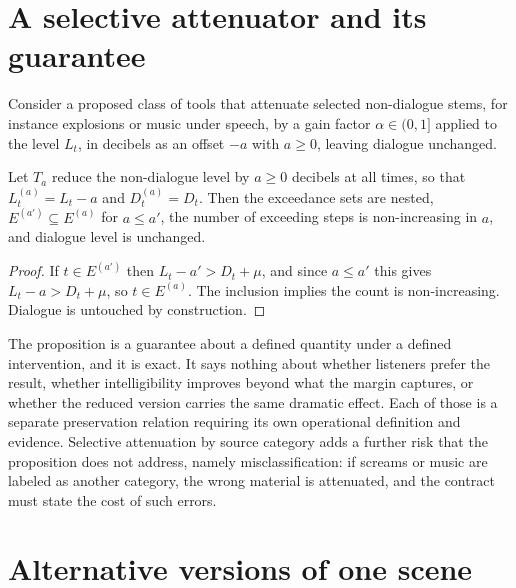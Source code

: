 \section{A selective attenuator and its guarantee}

Consider a proposed class of tools that attenuate selected non-dialogue stems, for instance explosions or music under speech, by a gain factor $\alpha\in(0,1]$ applied to the level $L_t$, in decibels as an offset $-a$ with $a\ge0$, leaving dialogue unchanged.

\begin{proposition}\label{prop:mufflerizer}
Let $T_a$ reduce the non-dialogue level by $a\ge0$ decibels at all times, so that $L_t^{(a)}=L_t-a$ and $D_t^{(a)}=D_t$. Then the exceedance sets are nested, $E^{(a')}\subseteq E^{(a)}$ for $a\le a'$, the number of exceeding steps is non-increasing in $a$, and dialogue level is unchanged.
\end{proposition}

\begin{proof}
If $t\in E^{(a')}$ then $L_t-a'>D_t+\mu$, and since $a\le a'$ this gives $L_t-a>D_t+\mu$, so $t\in E^{(a)}$. The inclusion implies the count is non-increasing. Dialogue is untouched by construction.
\end{proof}

The proposition is a guarantee about a defined quantity under a defined intervention, and it is exact. It says nothing about whether listeners prefer the result, whether intelligibility improves beyond what the margin captures, or whether the reduced version carries the same dramatic effect. Each of those is a separate preservation relation requiring its own operational definition and evidence. Selective attenuation by source category adds a further risk that the proposition does not address, namely misclassification: if screams or music are labeled as another category, the wrong material is attenuated, and the contract must state the cost of such errors.

\section{Alternative versions of one scene}\label{sec:altversions}

